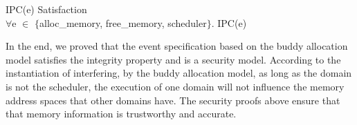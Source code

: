 \begin{theorem} {IPC(e) Satisfaction} \\
	$\forall$e $\in$ $\lbrace$alloc\_memory, free\_memory, scheduler$\rbrace$. IPC(e)
\end{theorem}

In the end, we proved that the event specification based on the buddy allocation model satisfies the integrity property and is a security model. According to the instantiation of interfering, by the buddy allocation model, as long as the domain is not the scheduler, the execution of one domain will not influence the memory address spaces that other domains have. The security proofs above ensure that that memory information is trustworthy and accurate.
